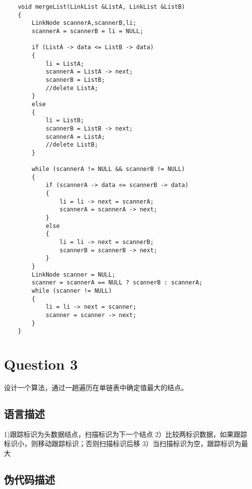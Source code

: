 \documentclass{article}
\begin{document}
\begin{verbatim}
    void mergeList(LinkList &ListA, LinkList &ListB)
    {
        LinkNode scannerA,scannerB,li;
        scannerA = scannerB = li = NULL;

        if (ListA -> data <= ListB -> data)
        {
            li = ListA;
            scannerA = ListA -> next;
            scannerB = ListB;
            //delete ListA;
        }
        else
        {
            li = ListB;
            scannerB = ListB -> next;
            scannerA = ListA;
            //delete ListB;
        }

        while (scannerA != NULL && scannerB != NULL)
        {
            if (scannerA -> data <= scannerB -> data)
            {
                li = li -> next = scannerA;
                scannerA = scannerA -> next;
            }
            else
            {
                li = li -> next = scannerB;
                scannerB = scannerB -> next;
            }
        }
        LinkNode scanner = NULL;
        scanner = scannerA == NULL ? scannerB : scannerA;
        while (scanner != NULL)
        {
            li = li -> next = scanner;
            scanner = scanner -> next;
        }
    }

\end{verbatim}

\section{Question 3} 

设计一个算法，通过一趟遍历在单链表中确定值最大的结点。


\subsection{语言描述} 

1)跟踪标识为头数据结点，扫描标识为下一个结点
2）比较两标识数据，如果跟踪标识小，则移动跟踪标识；否则扫描标识后移
3）当扫描标识为空，跟踪标识为最大

\subsection{伪代码描述}



\begin{codebox}


\end{codebox}
\end{document}
